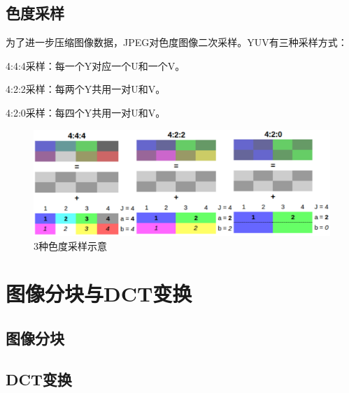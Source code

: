 \subsection{色度采样}
为了进一步压缩图像数据，JPEG对色度图像二次采样。YUV有三种采样方式：

4:4:4采样：每一个Y对应一个U和一个V。

4:2:2采样：每两个Y共用一对U和V。

4:2:0采样：每四个Y共用一对U和V。

\begin{figure}
    \centering
    \includegraphics[width=1.0\textwidth]{pages/jpeg/chrominance_sample.png}
    \caption{3种色度采样示意}
    \label{Fig.chrominance_sample}
\end{figure}


\section{图像分块与DCT变换}
\subsection{图像分块}
\subsection{DCT变换}

